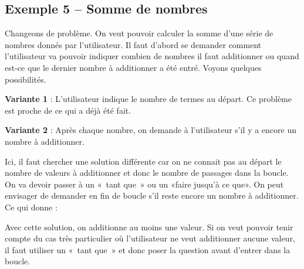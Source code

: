 	\subsection{Exemple 5 -- Somme de nombres}

		Changeons de problème. On veut pouvoir calculer
		la somme d'une série de nombres donnés par
		l'utilisateur. Il faut d'abord se
		demander comment l'utilisateur va pouvoir indiquer
		combien de nombres il faut additionner ou quand est-ce que le dernier
		nombre à additionner a été entré. Voyons quelques possibilités.

		\textbf{Variante 1} : 
		L'utilisateur indique le nombre de termes au départ.
		Ce problème est proche de ce qui a déjà été fait.
		

		\textbf{Variante 2} : Après chaque nombre, 
		on demande à l'utilisateur s'il y a encore un nombre à additionner.

		Ici, il faut chercher une solution différente
		car on ne connait pas au départ le nombre de valeurs à additionner et
		donc le nombre de passages dans la boucle. On va devoir passer à un
		«~tant que~» ou un «faire jusqu'à ce que». On peut
		envisager de demander en fin de boucle s'il reste
		encore un nombre à additionner. Ce qui donne :

		
		Avec cette solution, on additionne au moins une valeur. 
		Si on veut pouvoir tenir compte du
		cas très particulier où l'utilisateur ne veut
		additionner aucune valeur, il faut utiliser un «~tant que~» et donc
		poser la question avant d'entrer dans la boucle.

